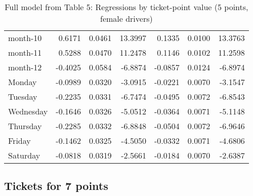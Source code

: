 \documentclass[10pt]{article}
\begin{document}
\begin{table}[ht]
\begin{tabular}{lrrrrrr}
  month-10 & 0.6171 & 0.0461 & 13.3997 & 0.1335 & 0.0100 & 13.3763 \\ 
  month-11 & 0.5288 & 0.0470 & 11.2478 & 0.1146 & 0.0102 & 11.2598 \\ 
  month-12 & -0.4025 & 0.0584 & -6.8874 & -0.0857 & 0.0124 & -6.8974 \\ 
  Monday & -0.0989 & 0.0320 & -3.0915 & -0.0221 & 0.0070 & -3.1547 \\ 
  Tuesday & -0.2235 & 0.0331 & -6.7474 & -0.0495 & 0.0072 & -6.8543 \\ 
  Wednesday & -0.1646 & 0.0326 & -5.0512 & -0.0364 & 0.0071 & -5.1148 \\ 
  Thursday & -0.2285 & 0.0332 & -6.8848 & -0.0504 & 0.0072 & -6.9646 \\ 
  Friday & -0.1462 & 0.0325 & -4.5050 & -0.0332 & 0.0071 & -4.6806 \\ 
  Saturday & -0.0818 & 0.0319 & -2.5661 & -0.0184 & 0.0070 & -2.6387 \\ 
   \hline
\end{tabular}
\caption{Full model from Table 5: Regressions by ticket-point value (5 points, female drivers)} 
\label{tab_5_5_pts_no_age_F}
\end{table}


\clearpage
\pagebreak




\subsection{Tickets for 7 points}



\end{document}
